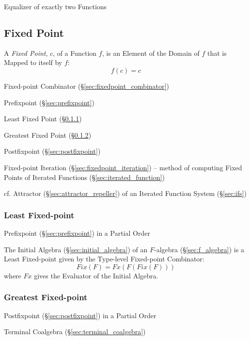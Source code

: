Equalizer of exactly two Functions



\subsection{Fixed Point}\label{sec:fixed_point}

A \emph{Fixed Point}, $c$, of a Function $f$, is an Element of the Domain of $f$
that is Mapped to itself by $f$:
\[
  f(c) = c
\]

Fixed-point Combinator (\S\ref{sec:fixedpoint_combinator})

Prefixpoint (\S\ref{sec:prefixpoint})

Least Fixed Point (\S\ref{sec:least_fixedpoint})

Greatest Fixed Point (\S\ref{sec:greatest_fixedpoint})

Postfixpoint (\S\ref{sec:postfixpoint})

\fist Fixed-point Iteration (\S\ref{sec:fixedpoint_iteration}) -- method of
computing Fixed Points of Iterated Functions (\S\ref{sec:iterated_function})

cf. Attractor (\S\ref{sec:attractor_repeller}) of an Iterated Function System
(\S\ref{sec:ifs})



\subsubsection{Least Fixed-point}\label{sec:least_fixedpoint}

Prefixpoint (\S\ref{sec:prefixpoint}) in a Partial Order

The Initial Algebra (\S\ref{sec:initial_algebra}) of an $F$-algebra
(\S\ref{sec:f_algebra}) is a Least Fixed-point given by the Type-level
Fixed-point Combinator:
\[
  Fix (F) = Fx(F (Fix (F)))
\]
where $Fx$ gives the Evaluator of the Initial Algebra.



\subsubsection{Greatest Fixed-point}\label{sec:greatest_fixedpoint}

Postfixpoint (\S\ref{sec:postfixpoint}) in a Partial Order

Terminal Coalgebra (\S\ref{sec:terminal_coalgebra})



